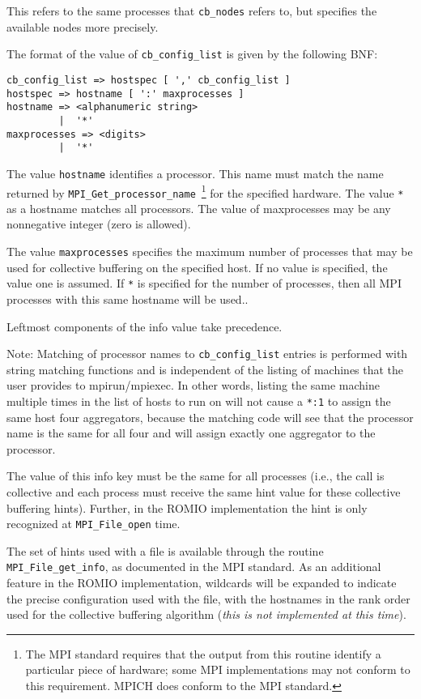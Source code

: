 This refers to the same processes that \texttt{cb\_nodes} refers to,
but specifies the available nodes more precisely.

The format of the value of \texttt{cb\_config\_list} is given by the
following BNF:
\begin{verbatim}
cb_config_list => hostspec [ ',' cb_config_list ]
hostspec => hostname [ ':' maxprocesses ]
hostname => <alphanumeric string>
         |  '*' 
maxprocesses => <digits>
         |  '*'
\end{verbatim}

The value \texttt{hostname} identifies a processor. This name must match
the name returned by \texttt{MPI\_Get\_processor\_name}~\footnote{The
MPI standard requires that the output from this routine identify a
particular piece of hardware; some MPI implementations may not conform
to this requirement. MPICH does conform to the MPI standard.}
%
for the specified hardware. The value \texttt{*} as a hostname matches all
processors. The value of maxprocesses may be any nonnegative integer
(zero is allowed).

The value \texttt{maxprocesses} specifies the maximum number of
processes that may be used for collective buffering on the specified
host. If no value is specified, the value one is assumed. If \texttt{*}
is specified for the number of processes, then all MPI processes with
this same hostname will be used..

Leftmost components of the info value take precedence.

Note: Matching of processor names to \texttt{cb\_config\_list} entries
is performed with string matching functions and is independent of the
listing of machines that the user provides to mpirun/mpiexec.  In other
words, listing the same machine multiple times in the list of hosts to
run on will not cause a \texttt{*:1} to assign the same host four
aggregators, because the matching code will see that the processor name
is the same for all four and will assign exactly one aggregator to the
processor.

The value of this info key must be the same for all processes (i.e., the
call is collective and each process must receive the same hint value for
these collective buffering hints).  Further, in the ROMIO implementation
the hint is only recognized at \texttt{MPI\_File\_open} time.

The set of hints used with a file is available through the routine
\texttt{MPI\_File\_get\_info}, as documented in the MPI standard.
As an additional feature in the ROMIO implementation, wildcards will
be expanded to indicate the precise configuration used with the file,
with the hostnames in the rank order used for the collective buffering
algorithm (\emph{this is not implemented at this time}).

